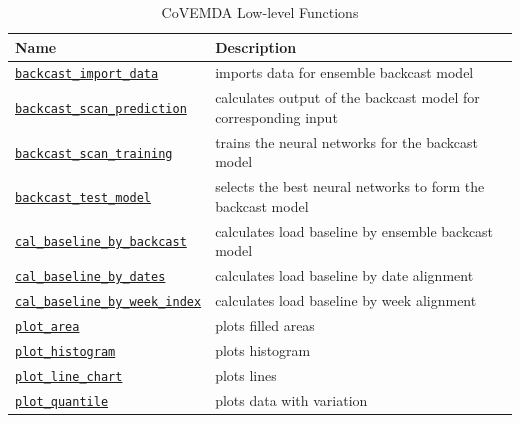 \documentclass[10pt]{article}
\newcommand{\covemda}{CoVEMDA}
\numberwithin{equation}{section}
\numberwithin{table}{section}
\numberwithin{figure}{section}
\begin{document}
\begin{appendices}
\begin{table}[!ht]
    \centering
    \begin{threeparttable}
    \caption{\covemda{} Low-level Functions}
    \label{tab:low_level_func}
    \footnotesize
    \begin{tabular}{ll}
        \toprule
        Name & Description \\
        \midrule
        \hyperref[func:backcast_import_data]{\texttt{backcast\_import\_data}} & imports data for ensemble backcast model \\
        \hyperref[func:backcast_scan_prediction]{\texttt{backcast\_scan\_prediction}} & calculates output of the backcast model for corresponding input \\
        \hyperref[func:backcast_scan_training]{\texttt{backcast\_scan\_training}} & trains the neural networks for the backcast model \\
        \hyperref[func:backcast_test_model]{\texttt{backcast\_test\_model}} & selects the best neural networks to form the backcast model \\
        \hyperref[func:cal_baseline_by_backcast]{\texttt{cal\_baseline\_by\_backcast}} & calculates load baseline by ensemble backcast model \\
        \hyperref[func:cal_baseline_by_dates]{\texttt{cal\_baseline\_by\_dates}} & calculates load baseline by date alignment \\
        \hyperref[func:cal_baseline_by_week_index]{\texttt{cal\_baseline\_by\_week\_index}} & calculates load baseline by week alignment \\
        \hyperref[func:plot_area]{\texttt{plot\_area}} & plots filled areas \\
        \hyperref[func:plot_histogram]{\texttt{plot\_histogram}} & plots histogram \\
        \hyperref[func:plot_line_chart]{\texttt{plot\_line\_chart}} & plots lines \\
        \hyperref[func:plot_quantile]{\texttt{plot\_quantile}} & plots data with variation \\
        \bottomrule
    \end{tabular}
    \end{threeparttable}
\end{table}


\end{appendices}
\end{document}
